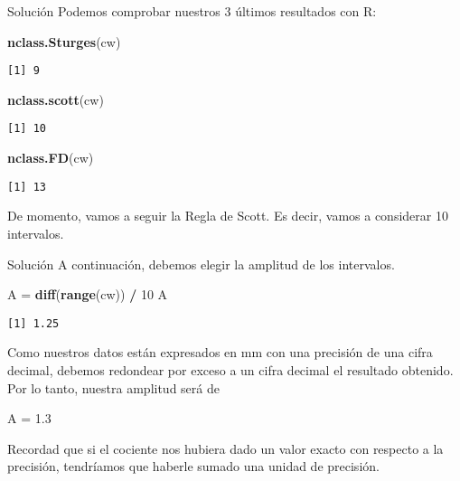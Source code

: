 \documentclass[
  ignorenonframetext,
]{beamer}
\newenvironment{Shaded}{\begin{snugshade}}{\end{snugshade}}
\newcommand{\DecValTok}[1]{\textcolor[rgb]{0.00,0.00,0.81}{#1}}
\newcommand{\FloatTok}[1]{\textcolor[rgb]{0.00,0.00,0.81}{#1}}
\newcommand{\KeywordTok}[1]{\textcolor[rgb]{0.13,0.29,0.53}{\textbf{#1}}}
\newcommand{\NormalTok}[1]{#1}
\newcommand{\OperatorTok}[1]{\textcolor[rgb]{0.81,0.36,0.00}{\textbf{#1}}}
\newcommand{\StringTok}[1]{\textcolor[rgb]{0.31,0.60,0.02}{#1}}
\begin{document}
\begin{frame}[fragile]{Solución}
\protect\hypertarget{soluciuxf3n-3}{}
Podemos comprobar nuestros 3 últimos resultados con R:

\begin{Shaded}
\begin{Highlighting}[]
\KeywordTok{nclass.Sturges}\NormalTok{(cw)}
\end{Highlighting}
\end{Shaded}

\begin{verbatim}
[1] 9
\end{verbatim}

\begin{Shaded}
\begin{Highlighting}[]
\KeywordTok{nclass.scott}\NormalTok{(cw)}
\end{Highlighting}
\end{Shaded}

\begin{verbatim}
[1] 10
\end{verbatim}

\begin{Shaded}
\begin{Highlighting}[]
\KeywordTok{nclass.FD}\NormalTok{(cw)}
\end{Highlighting}
\end{Shaded}

\begin{verbatim}
[1] 13
\end{verbatim}

De momento, vamos a seguir la Regla de Scott. Es decir, vamos a
considerar 10 intervalos.
\end{frame}

\begin{frame}[fragile]{Solución}
\protect\hypertarget{soluciuxf3n-4}{}
A continuación, debemos elegir la amplitud de los intervalos.

\begin{Shaded}
\begin{Highlighting}[]
\NormalTok{A =}\StringTok{ }\KeywordTok{diff}\NormalTok{(}\KeywordTok{range}\NormalTok{(cw)) }\OperatorTok{/}\StringTok{ }\DecValTok{10}
\NormalTok{A}
\end{Highlighting}
\end{Shaded}

\begin{verbatim}
[1] 1.25
\end{verbatim}

Como nuestros datos están expresados en mm con una precisión de una
cifra decimal, debemos redondear por exceso a un cifra decimal el
resultado obtenido. Por lo tanto, nuestra amplitud será de

\begin{Shaded}
\begin{Highlighting}[]
\NormalTok{A =}\StringTok{ }\FloatTok{1.3}
\end{Highlighting}
\end{Shaded}

Recordad que si el cociente nos hubiera dado un valor exacto con
respecto a la precisión, tendríamos que haberle sumado una unidad de
precisión.
\end{frame}
\end{document}

